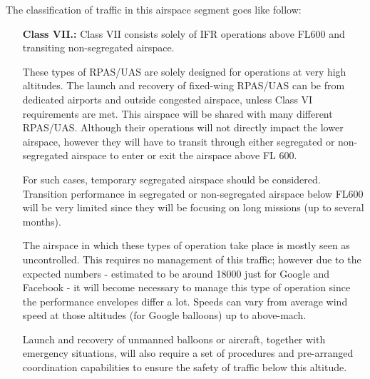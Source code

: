 \noindent The classification of traffic in this airspace segment goes like follow:

\begin{itemize}
    \item[\textbf{Class VII.:}]Class VII consists solely of IFR operations above FL600 and transiting non-segregated airspace.
    
    These types of RPAS/UAS are solely designed for operations at very high altitudes. The launch and recovery of fixed-wing RPAS/UAS can be from dedicated airports and outside congested airspace, unless Class VI requirements are met. This airspace will be shared with many different RPAS/UAS. Although their operations will not directly impact the lower airspace, however they will have to transit through either segregated or non-segregated airspace to enter or exit the airspace above FL 600.
    
    For such cases, temporary segregated airspace should be considered. Transition performance in segregated or non-segregated airspace below FL600 will be very limited since they will be focusing on long missions (up to several months).

    The airspace in which these types of operation take place is mostly seen as uncontrolled. This requires no management of this traffic; however due to the expected numbers - estimated to be around 18000 just for Google and Facebook - it will become necessary to manage this type of operation since the performance envelopes differ a lot. Speeds can vary from average wind speed at those altitudes (for Google balloons) up to above-mach.

    Launch and recovery of unmanned balloons or aircraft, together with emergency situations, will also require a set of procedures and pre-arranged coordination capabilities to ensure the safety of traffic below this altitude.
\end{itemize}
